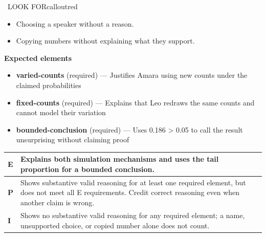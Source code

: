 \documentclass[11pt]{article}
\begin{document}
\begin{callout}{\IconWarn\ LOOK FOR}{calloutred}
\begin{itemize}[leftmargin=1.5em,itemsep=2pt,topsep=2pt]
  \item Choosing a speaker without a reason.
  \item Copying numbers without explaining what they support.
\end{itemize}
\end{callout}


\textbf{Expected elements}
\begin{itemize}[leftmargin=1.5em,itemsep=2pt,topsep=2pt]
  \item \textbf{varied-counts} (required) --- Justifies Amara using new counts under the claimed probabilities
  \item \textbf{fixed-counts} (required) --- Explains that Leo redraws the same counts and cannot model their variation
  \item \textbf{bounded-conclusion} (required) --- Uses 0.186 > 0.05 to call the result unsurprising without claiming proof
\end{itemize}

{\small\renewcommand{\arraystretch}{1.25}
\noindent\begin{tabular}{|p{0.5in}|p{5.9in}|}
\hline
\textbf{E} & Explains both simulation mechanisms and uses the tail proportion for a bounded conclusion. \\ \hline
\textbf{P} & Shows substantive valid reasoning for at least one required element, but does not meet all E requirements. Credit correct reasoning even when another claim is wrong. \\ \hline
\textbf{I} & Shows no substantive valid reasoning for any required element; a name, unsupported choice, or copied number alone does not count. \\ \hline
\end{tabular}}

\clearpage
{}
\end{document}
